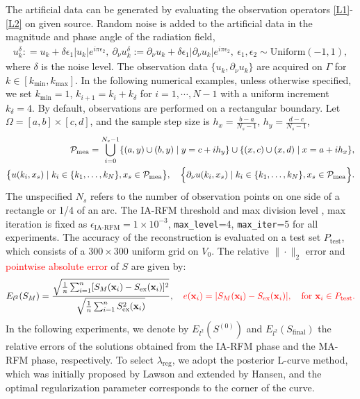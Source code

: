 \documentclass{article}
\newcommand{\red}[1]{\textcolor{red}{#1}}
\theoremstyle{plain}
\theoremstyle{definition}
\newcounter{example}[section]         %
\begin{document}
{ The artificial data can be generated by evaluating the observation operators \eqref{L1}-\eqref{L2} on given source. 
 Random noise is added to the artificial data in the magnitude and phase angle of the radiation field,
\begin{align}\label{u_noise}
    u^{\delta} _k: =u_k+\delta \epsilon_1 |u_k|e^{i\pi\epsilon_2 }, \     
    {\partial_\nu u^{\delta}_k}:={\partial_\nu u_k} +\delta \epsilon_1 \bigl|{\partial_\nu u_k}\bigr|e^{i\pi\epsilon_2 },  \ 
    \epsilon_1,  \epsilon_2 \sim \text{Uniform}(-1, 1), 
\end{align}
where $\delta$ is the noise level. The observation data $\{u_k, {\partial_\nu u_k}\}$ are acquired on $\Gamma$ for $k\in [k_{\text{min}}, k_{\text{max}}]$. In the following numerical examples,  unless otherwise specified,  we set $k_{\text{min}}=1$,  $k_{i+1}=k_i+ k_\delta$ for $i=1, \cdots, N-1$ with a uniform increment $k_\delta = 4$. By default, observations are performed on a rectangular boundary. Let $\Omega=[a, b]\times[c, d]$, and the sample step size is $h_x=\frac{b-a}{N_s-1}$, $h_y=\frac{d-c}{N_s-1}$, 
\begin{align*}
\mathcal{P}_{\text{mea}}= \bigcup_{i=0}^{N_s - 1}
\{(a, y)\cup(b, y)\mid y=c+i h_y\}
\cup\{(x, c)\cup(x, d)\mid x=a+ih_x \},\\
\bigl\{u(k_i, x_s)\mid k_i\in\{k_1, \ldots, k_N\}, x_s\in \mathcal{P}_{\text{mea}} \bigr\}, \quad 
\Bigl\{{\partial_\nu u(k_i, x_s)} \mid k_i\in\{k_1, \ldots, k_N\}, x_s\in \mathcal{P}_{\text{mea}}\Bigr\}.
\end{align*}
The unspecified $N_s$ refers to the number of observation points on one side of a rectangle or 1/4 of an arc.  {The IA-RFM threshold and max division level , max iteration  is fixed as $\epsilon_{\mathrm{IA\text{-}RFM}} = 1\times10^{-3}$, {\tt max\_level}=4, {\tt max\_iter}=5 for all experiments.
The accuracy of the reconstruction is evaluated on a test set $P_{\text{test}}$, which consists of a $300 \times 300$ uniform grid on $V_0$. }  The relative $\|\cdot\|_2$ error and \red{pointwise absolute error} of $S$ are given by: 
\begin{align}\label{error}
E_{l^2}(S_M)=\frac{\sqrt{\frac{1}{n}\sum_{i=1}^{n}[S_M(\mathbf{x}_{i})-S_{\text{ex}}(\mathbf{x}_{i})]^{2}}}{\sqrt{\frac{1}{n}\sum_{i=1}^{n}S_{\text{ex}}^{2}(\mathbf{x}_{i})}}, \quad \red{e(\mathbf{x}_i)=|S_M(\mathbf{x_i})-S_{\text{ex}}(\mathbf{x}_i)|,\quad \text{for} \ \mathbf{x}_i \in P_{\text{test}}.}
\end{align}
 {In the following experiments, we denote by $E_{l^2}(S^{(0)})$ and $E_{l^2}(S_{\text{final}})$ the relative errors of the solutions obtained from the IA-RFM phase and the MA-RFM phase, respectively.} To select $\lambda_{\text{reg}}$, we adopt the posterior L-curve \cite{hansen1992L-curve} method, which was initially proposed by Lawson and extended by Hansen, and the optimal regularization parameter corresponds to the corner of the curve.
}
\end{document}
